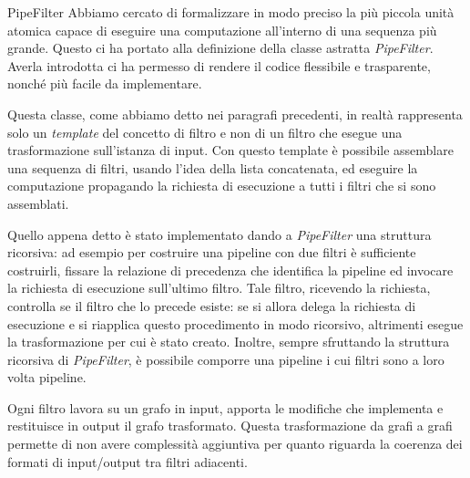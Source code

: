 \begin{paragraph}{PipeFilter}
  Abbiamo cercato di formalizzare in modo preciso la pi\`u piccola
  unit\`a atomica capace di eseguire una computazione all'interno di
  una sequenza pi\`u grande. Questo ci ha portato alla definizione
  della classe astratta \emph{PipeFilter}. Averla introdotta ci ha
  permesso di rendere il codice flessibile e trasparente, nonch\'e
  pi\`u facile da implementare.

  Questa classe, come abbiamo detto nei paragrafi precedenti, in
  realt\`a rappresenta solo un \emph{template} del concetto di filtro
  e non di un filtro che esegue una trasformazione sull'istanza di
  input. Con questo template \`e possibile assemblare una sequenza di
  filtri, usando l'idea della lista concatenata, ed eseguire la
  computazione propagando la richiesta di esecuzione a tutti i filtri
  che si sono assemblati.

  Quello appena detto \`e stato implementato dando a \emph{PipeFilter}
  una struttura ricorsiva: ad esempio per costruire una pipeline con
  due filtri \`e sufficiente costruirli, fissare la relazione di
  precedenza che identifica la pipeline ed invocare la richiesta di
  esecuzione sull'ultimo filtro. Tale filtro, ricevendo la richiesta,
  controlla se il filtro che lo precede esiste: se si allora delega la
  richiesta di esecuzione e si riapplica questo procedimento in modo
  ricorsivo, altrimenti esegue la trasformazione per cui \`e stato
  creato. Inoltre, sempre sfruttando la struttura ricorsiva di
  \emph{PipeFilter}, \`e possibile comporre una pipeline i cui filtri
  sono a loro volta pipeline.

  Ogni filtro lavora su un grafo in input, apporta le modifiche che
  implementa e restituisce in output il grafo trasformato. Questa
  trasformazione da grafi a grafi permette di non avere complessit\`a
  aggiuntiva per quanto riguarda la coerenza dei formati di
  input/output tra filtri adiacenti.
\end{paragraph}

